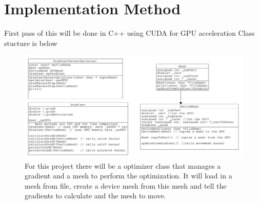 \documentclass[]{article}
\begin{document}
\section{Implementation Method}
First pass of this will be done in C++ using CUDA for GPU acceleration Class stucture is below
\begin{figure}[h]
	\centering
	\includegraphics[width=1\linewidth]{Classes}
	\caption[Class Diagram]{For this project there will be a optimizer class that manages a gradient and a mesh to perform the optimization. It will load in a mesh from file, create a device mesh from this mesh and tell the gradients to calculate and the mesh to move.}
	\label{fig:classes}
\end{figure}
\end{document}

